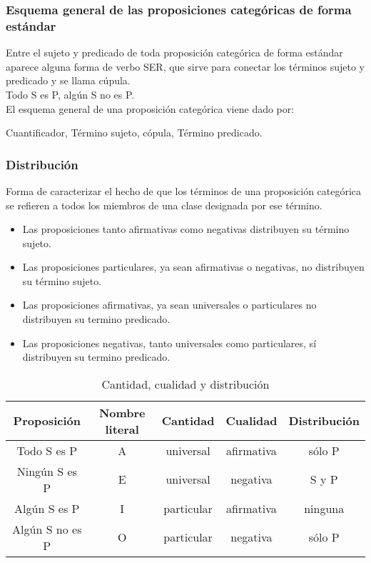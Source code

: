 \documentclass[10pt]{book} 						%
\begin{document}
\subsubsection{Esquema general de las proposiciones categóricas de forma estándar}
Entre el sujeto y predicado de toda proposición categórica de forma estándar aparece alguna forma de verbo SER, que sirve para conectar los términos sujeto y predicado y se llama cúpula.\\
Todo S es P, algún S no es P.\\
El esquema general de una proposición categórica viene dado por:\\
\begin{center}
Cuantificador, Término sujeto, cópula, Término predicado.
\end{center}

\subsubsection{Distribución}
Forma de caracterizar el hecho de que los términos de una proposición categórica se refieren a todos los miembros de una clase designada por ese término.
\begin{itemize}
\item Las proposiciones tanto afirmativas como negativas distribuyen su término sujeto. 
\item Las proposiciones particulares, ya sean afirmativas o negativas, no distribuyen su término sujeto.
\item Las proposiciones afirmativas, ya sean universales o particulares no distribuyen su termino predicado.
\item Las proposiciones negativas, tanto universales como particulares, sí distribuyen su termino predicado.
\end{itemize}
\begin{table}
\centering
\caption{Cantidad, cualidad y distribución}
\begin{tabular}{c c c c c}
\textbf{Proposición} & \textbf{Nombre literal} & \textbf{Cantidad} & \textbf{Cualidad} & \textbf{Distribución} \\
\hline
Todo S es P& A & universal & afirmativa & sólo P \\
 Ningún S es P & E & universal & negativa & S y P \\
Algún S es P& I & particular & afirmativa & ninguna \\
 Algún S no es P & O & particular & negativa & sólo P \\
\end{tabular}
\end{table}
\end{document}
